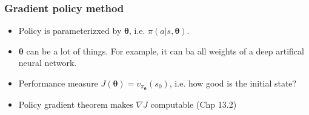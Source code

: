 \begin{frame}
    \frametitle{Gradient policy method}
    \begin{itemize}
        \item Policy is parameterizxed by $\mathbf{\theta}$, i.e. $\pi(a|s,\mathbf{\theta})$.
        \item $\mathbf{\theta}$ can be a lot of things. For example, it can ba all weights of a deep artifical neural network.
        \item Performance measure $J(\mathbf{\theta}) = v_{\pi_\mathbf{\theta}}(s_0)$, i.e. how good is the initial state?
        \item Policy gradient theorem makes $\nabla J$ computable (Chp 13.2)
    \end{itemize}
\end{frame}